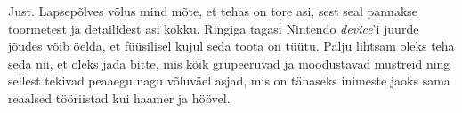 
Just. Lapsepõlves võlus mind mõte, et tehas on 
tore asi, sest seal pannakse toormetest ja detailidest asi kokku. Ringiga 
tagasi Nintendo \emph{device}'i 
juurde jõudes võib öelda, et füüsilisel kujul seda toota on tüütu. Palju 
lihtsam oleks teha 
seda nii, et oleks jada bitte, mis kõik grupeeruvad ja moodustavad 
mustreid ning sellest tekivad peaaegu nagu võluväel asjad, mis on
tänaseks inimeste jaoks sama reaalsed tööriistad kui haamer ja höövel.
